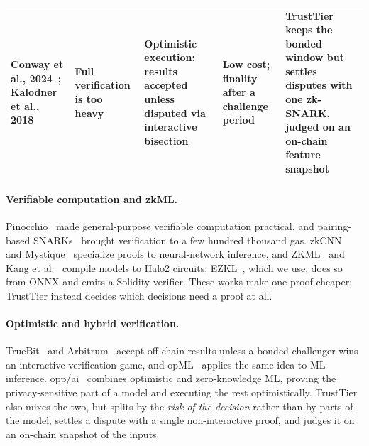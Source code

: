 \documentclass[sigconf,nonacm]{acmart}
\begin{document}
\begin{table}[t]
\begin{tabularx}{\textwidth}{@{}P{3.3cm}LLLL@{}}
    \addlinespace
    Conway et al., 2024~\cite{conway2024opml}; Kalodner et al., 2018~\cite{kalodner2018arbitrum} & Full verification is too heavy & Optimistic execution: results accepted unless disputed via interactive bisection & Low cost; finality after a challenge period & TrustTier keeps the bonded window but settles disputes with one zk-SNARK, judged on an on-chain feature snapshot \\
    \bottomrule
  \end{tabularx}
\end{table}

\paragraph{Verifiable computation and zkML.} Pinocchio~\cite{parno2013pinocchio} made general-purpose verifiable computation practical, and pairing-based SNARKs~\cite{groth2016size,gabizon2019plonk} brought verification to a few hundred thousand gas. zkCNN~\cite{liu2021zkcnn} and Mystique~\cite{weng2021mystique} specialize proofs to neural-network inference, and ZKML~\cite{chen2024zkml} and Kang et al.~\cite{kang2022scaling} compile models to Halo2 circuits; EZKL~\cite{ezkl}, which we use, does so from ONNX and emits a Solidity verifier. These works make one proof cheaper; TrustTier instead decides which decisions need a proof at all.

\paragraph{Optimistic and hybrid verification.} TrueBit~\cite{teutsch2019truebit} and Arbitrum~\cite{kalodner2018arbitrum} accept off-chain results unless a bonded challenger wins an interactive verification game, and opML~\cite{conway2024opml} applies the same idea to ML inference. opp/ai~\cite{so2024oppai} combines optimistic and zero-knowledge ML, proving the privacy-sensitive part of a model and executing the rest optimistically. TrustTier also mixes the two, but splits by the \emph{risk of the decision} rather than by parts of the model, settles a dispute with a single non-interactive proof, and judges it on an on-chain snapshot of the inputs.
\end{document}
